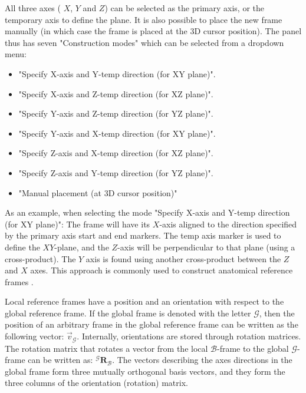 \documentclass{article}
\begin{document}
All three axes ( \(X\), \(Y\) and \(Z\)) can be selected as the primary axis, or the temporary axis to define the plane. It is also possible to place the new frame manually (in which case the frame is placed at the 3D cursor position). The panel thus has seven "Construction modes" which can be selected from a dropdown menu:

\begin{itemize}
    \item "Specify X-axis and Y-temp direction (for XY plane)".  
    \item "Specify X-axis and Z-temp direction (for XZ plane)".
    \item "Specify Y-axis and Z-temp direction (for YZ plane)".
    \item "Specify Y-axis and X-temp direction (for XY plane)".
    \item "Specify Z-axis and X-temp direction (for XZ plane)".
    \item "Specify Z-axis and Y-temp direction (for YZ plane)".
    \item "Manual placement (at 3D cursor position)"
\end{itemize}


As an example, when selecting the mode "Specify X-axis and Y-temp direction (for XY plane)": The frame will have its \(X\)-axis aligned to the direction specified by the primary axis start and end markers. The temp axis marker is used to define the \(XY\)-plane, and the \(Z\)-axis will be perpendicular to that plane (using a cross-product). The \(Y\) axis is found using another cross-product between the \(Z\) and \(X\) axes. This approach is commonly used to construct anatomical reference frames \cite{wuISBRecommendationsStandardization1995,wuISBRecommendationDefinitions2002,wuISBRecommendationDefinitions2005}.

Local reference frames have a position and an orientation with respect to the global reference frame. If the global frame is denoted with the letter \(\mathcal{G}\), then the position of an arbitrary frame in the global reference frame can be written as the following vector: \(\vec{v}_{\mathcal{G}}\). Internally, orientations are stored through rotation matrices. The rotation matrix that rotates a vector from the local \(\mathcal{B}\)-frame to the global \(\mathcal{G}\)-frame can be written as: \({}^{\mathcal{G}} \mathbf{R}_{\mathcal{B}}\). The vectors describing the axes directions in the global frame form three mutually orthogonal basis vectors, and they form the three columns of the orientation (rotation) matrix.
\end{document}
